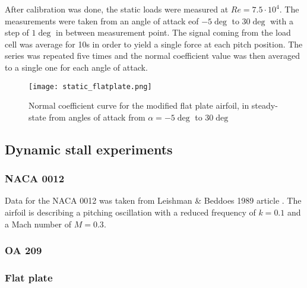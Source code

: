 After calibration was done, the static loads were measured at $Re=7.5\cdot10^4$. The measurements were taken from an angle of attack eof $-5 \deg$ to $30 \deg$ with a step of $1 \deg$ in between measurement point. The signal coming from the load cell was average for 10s in order to yield a single force at each pitch position. The series was repeated five times and the normal coefficient value was then averaged to a single one for each angle of attack. 

\begin{wrapfigure}{r}{10cm}
\centering
\texttt{[image: static\_flatplate.png]}
\caption{Normal coefficient curve for the modified flat plate airfoil, in steady-state from angles of attack from $\alpha=-5 \deg$ to $30 \deg$}
\label{fig:static_flatplate}
\end{wrapfigure}

\subsection{Dynamic stall experiments}

\subsubsection{NACA 0012}

Data for the NACA 0012 was taken from Leishman \& Beddoes 1989 article \cite{leishman_semi-empirical_1989}. The airfoil is describing a pitching oscillation with a reduced frequency of $k=0.1$ and a Mach number of $M=0.3$.

\subsubsection{OA 209}

\subsubsection{Flat plate}

